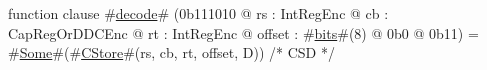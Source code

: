 function clause #\hyperref[sailMIPSzdecode]{decode}# (0b111010 @ rs : IntRegEnc @ cb : CapRegOrDDCEnc @ rt : IntRegEnc @ offset : #\hyperref[sailMIPSzbits]{bits}#(8) @ 0b0 @ 0b11) = #\hyperref[sailMIPSzSome]{Some}#(#\hyperref[sailMIPSzCStore]{CStore}#(rs, cb, rt, offset, D)) /* CSD */
